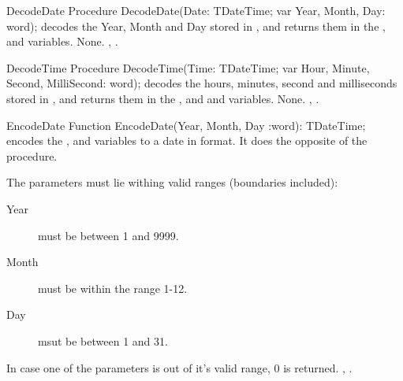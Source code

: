 \begin{procedure}{DecodeDate}
\Declaration
Procedure DecodeDate(Date: TDateTime; var Year, Month, Day: word);
\Description
{} decodes the Year, Month and Day stored in ,
and returns them in the ,  and  variables.
\Errors
None.
\SeeAlso
{}, .
\end{procedure}

\html{}

 
\begin{procedure}{DecodeTime}
\Declaration
Procedure DecodeTime(Time: TDateTime; var Hour, Minute, Second, MilliSecond: word);
\Description
{} decodes the hours, minutes, second and milliseconds stored 
in , and returns them in the ,  and
 and  variables.
\Errors
None.
\SeeAlso
{}, .
\end{procedure}

\html{}
 
\begin{function}{EncodeDate}
\Declaration
Function EncodeDate(Year, Month, Day :word): TDateTime;
\Description
{} encodes the ,  and  variables to 
a date in  format. It does the opposite of the
 procedure.

The parameters must lie withing valid ranges (boundaries included):
\begin{description}
\item[Year] must be between 1 and 9999.
\item[Month] must be within the range 1-12.
\item[Day] msut be between 1 and 31.
\end{description}
\Errors
In case one of the parameters is out of it's valid range, 0 is returned.
\SeeAlso
{}, .
\end{function}

\html{}

